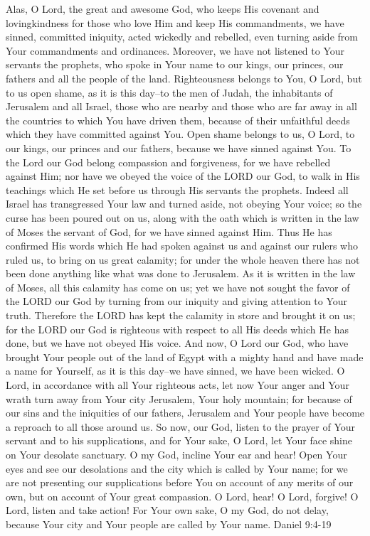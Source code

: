 \documentclass[]{book}
\begin{document}
Alas, O Lord, the great and awesome God, who keeps His covenant and lovingkindness for those who love Him and keep His commandments, we have sinned, committed iniquity, acted wickedly and rebelled, even turning aside from Your commandments and ordinances. Moreover, we have not listened to Your servants the prophets, who spoke in Your name to our kings, our princes, our fathers and all the people of the land. Righteousness belongs to You, O Lord, but to us open shame, as it is this day--to the men of Judah, the inhabitants of Jerusalem and all Israel, those who are nearby and those who are far away in all the countries to which You have driven them, because of their unfaithful deeds which they have committed against You. Open shame belongs to us, O Lord, to our kings, our princes and our fathers, because we have sinned against You. To the Lord our God belong compassion and forgiveness, for we have rebelled against Him; nor have we obeyed the voice of the LORD our God, to walk in His teachings which He set before us through His servants the prophets. Indeed all Israel has transgressed Your law and turned aside, not obeying Your voice; so the curse has been poured out on us, along with the oath which is written in the law of Moses the servant of God, for we have sinned against Him. Thus He has confirmed His words which He had spoken against us and against our rulers who ruled us, to bring on us great calamity; for under the whole heaven there has not been done anything like what was done to Jerusalem. As it is written in the law of Moses, all this calamity has come on us; yet we have not sought the favor of the LORD our God by turning from our iniquity and giving attention to Your truth. Therefore the LORD has kept the calamity in store and brought it on us; for the LORD our God is righteous with respect to all His deeds which He has done, but we have not obeyed His voice. And now, O Lord our God, who have brought Your people out of the land of Egypt with a mighty hand and have made a name for Yourself, as it is this day--we have sinned, we have been wicked. O Lord, in accordance with all Your righteous acts, let now Your anger and Your wrath turn away from Your city Jerusalem, Your holy mountain; for because of our sins and the iniquities of our fathers, Jerusalem and Your people have become a reproach to all those around us. So now, our God, listen to the prayer of Your servant and to his supplications, and for Your sake, O Lord, let Your face shine on Your desolate sanctuary. O my God, incline Your ear and hear! Open Your eyes and see our desolations and the city which is called by Your name; for we are not presenting our supplications before You on account of any merits of our own, but on account of Your great compassion. O Lord, hear! O Lord, forgive! O Lord, listen and take action! For Your own sake, O my God, do not delay, because Your city and Your people are called by Your name. \textbar{} Daniel 9:4-19
\end{document}
